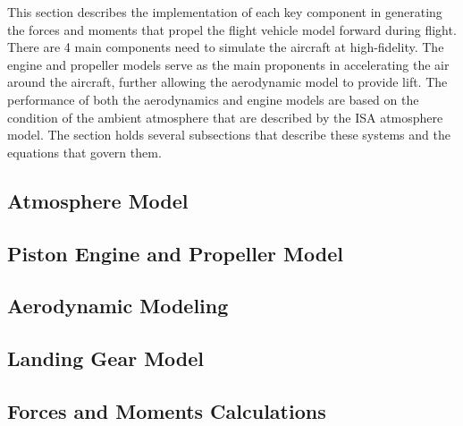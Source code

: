 \documentclass[../chapter_2.tex]{subfiles}
\begin{document}
This section describes the implementation of each key component in generating the forces and moments that propel the flight vehicle model forward during flight. There are 4 main components need to simulate the aircraft at high-fidelity. The engine and propeller models serve as the main proponents in accelerating the air around the aircraft, further allowing the aerodynamic model to provide lift. The performance of both the aerodynamics and engine models are based on the condition of the ambient atmosphere that are described by the ISA atmosphere model. The section holds several subsections that describe these systems and the equations that govern them.
\clearpage
\subsection{Atmosphere Model}

\clearpage
\subsection{Piston Engine and Propeller Model}

\clearpage
\subsection{Aerodynamic Modeling}

\clearpage
\subsection{Landing Gear Model}

\clearpage
\subsection{Forces and Moments Calculations}

\clearpage
\end{document}
